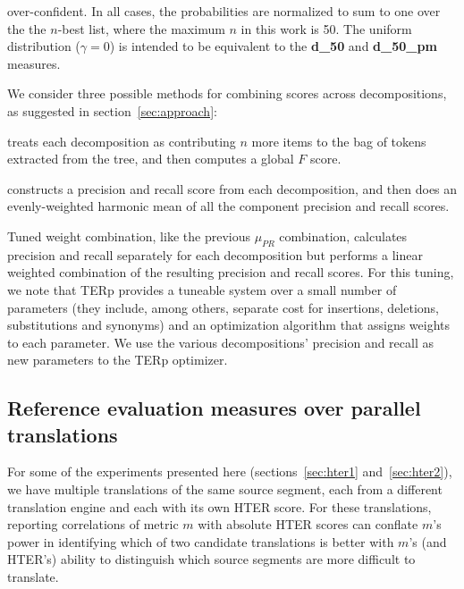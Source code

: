 \documentclass{kluwer}    %
\begin{document}
\begin{article}
\begin{description}
  over-confident.  In all cases, the probabilities are normalized to
  sum to one over the the $n$-best list, where the maximum $n$ in this
  work is 50.  The uniform distribution ($\gamma = 0$) is intended to
  be equivalent to the \cite{owczarzak07evaluatingmt}
  \textbf{d\_50} and \textbf{d\_50\_pm} measures.
\item[Score combination.] We consider three possible methods for
  combining scores across decompositions, as suggested in
  section~\ref{sec:approach}:
  \begin{description}
  \item[$F\lbrack\cdot\rbrack$] treats each decomposition as
    contributing $n$ more items to the bag of tokens extracted from
    the tree, and then computes a global $F$ score.
  \item[$\mu_{PR}\lbrack\cdot\rbrack$] constructs a precision and
    recall score from each decomposition, and then does an
    evenly-weighted harmonic mean of all the component precision and
    recall scores.
  \item Tuned weight combination, like the previous $\mu_{PR}$
    combination, calculates precision and
    recall separately for each decomposition but performs a linear
    weighted combination of the resulting precision and recall scores.
    For this tuning, we note that TERp \cite{snover09terp} provides a
    tuneable system over a small number of parameters (they include,
    among others, separate cost for insertions, deletions,
    substitutions and synonyms) and an optimization algorithm that
    assigns weights to each parameter. We use the various
    decompositions' precision and recall as new parameters to the TERp
    optimizer.
  \end{description}
\end{description}

\subsection{Reference evaluation measures over parallel translations}
\label{sec:metricsreference}
For some of the experiments presented here (sections~\ref{sec:hter1}
and~\ref{sec:hter2}), we have multiple translations of the same source
segment, each from a different translation engine and each with its
own HTER score.  For these translations, reporting correlations of
metric $m$ with absolute HTER scores can conflate $m$'s power in
identifying which of two candidate translations is better with $m$'s
(and HTER's) ability to distinguish which source segments are more
difficult to translate.


\end{article}
\end{document}
